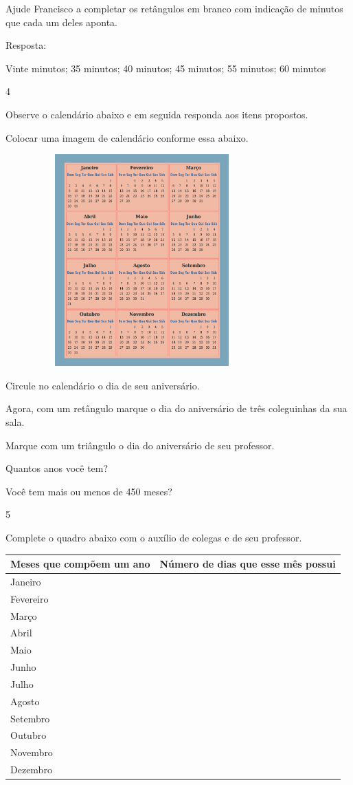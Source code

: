Ajude Francisco a completar os retângulos em branco com indicação de
minutos que cada um deles aponta.

Resposta:

Vinte minutos; 35 minutos; 40 minutos; 45 minutos; 55 minutos; 60
minutos

\num{4}

Observe o calendário abaixo e em seguida responda aos itens propostos.

Colocar uma imagem de calendário conforme essa abaixo.

\includegraphics[width=4.13369in,height=3.20861in]{media/image54.png}

\begin{escolha}
\item
  Circule no calendário o dia de seu aniversário.

\item
  Agora, com um retângulo marque o dia do aniversário de três
  coleguinhas da sua sala.

\item
  Marque com um triângulo o dia do aniversário de seu professor.

\item
  Quantos anos você tem?

\item
  Você tem mais ou menos de 450 meses?
\end{escolha}

\num{5}

Complete o quadro abaixo com o auxílio de colegas e de seu professor.

\begin{longtable}[]{@{}ll@{}}
\toprule
Meses que compõem um ano & Número de dias que esse mês
possui\tabularnewline
\midrule
\endhead
Janeiro &\tabularnewline
Fevereiro &\tabularnewline
Março &\tabularnewline
Abril &\tabularnewline
Maio &\tabularnewline
Junho &\tabularnewline
Julho &\tabularnewline
Agosto &\tabularnewline
Setembro &\tabularnewline
Outubro &\tabularnewline
Novembro &\tabularnewline
Dezembro &\tabularnewline
\bottomrule
\end{longtable}

